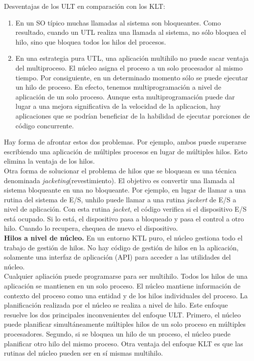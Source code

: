 \documentclass{article}
\begin{document}
					Desventajas de los ULT en comparación con los KLT:
					
					\begin{enumerate}
					\item En un SO típico muchas llamadas al sistema son bloqueantes. Como resultado, cuando un UTL realiza una llamada al sistema, no sólo bloquea el hilo, sino que bloquea todos los hilos del procesos. \\
					 \item En una estrategia pura UTL, una aplicación multihilo no puede sacar ventaja del multiproceso. El núcleo asigna el proceso a un solo procesador al mismo tiempo. Por consiguiente, en un determinado momento sólo se puede ejecutar un hilo de proceso. En efecto, tenemos multiprogramación a nivel de aplicación de un solo proceso. Aunque esta multiprogramación puede dar lugar a una mejora significativa de la velocidad de la aplicacion, hay aplicaciones que se podrían beneficiar de la habilidad de ejecutar porciones de código concurrente.
					\end{enumerate}
					
					Hay forma de afrontar estos dos problemas. Por ejemplo, ambos puede superarse escribiendo una aplicación de múltiples procesos en lugar de múltiples hilos. Esto elimina la ventaja de los hilos. \\
					
					Otra forma de solucionar el problema de hilos que se bloquean es una técnica denominada \textit{jacketing}(revestimiento). El objetivo es convertir una llamada al sistema bloqueante en una no bloqueante. Por ejemplo, en lugar de llamar a una rutina del sistema de E/S, unhilo puede llamar a una rutina \textit{jackert} de E/S a nivel de aplicación. Con esta rutina \textit{jacket}, el código verifica si el dispositivo E/S está ocupado. Si lo está, el dispositivo pasa a bloqueado y pasa el control a otro hilo. Cuando lo recupera, chequea de nuevo el dispositivo. \\
					
					\textbf{Hilos a nivel de núcleo.} En un entorno KTL puro, el núcleo gestiona todo el trabajo de gestión de hilos. No hay código de gestión de hilos en la aplicación, solamente una interfaz de aplicación (API) para acceder a las utilidades del núcleo. \\
					
					Cualquier apliación puede programarse para ser multihilo. Todos los hilos de una aplicación se mantienen en un solo proceso. El núcleo mantiene información de contexto del proceso como una entidad y de los hilos individuales del proceso. La planificación realizada por el núcleo se realiza a nivel de hilo. Este enfoque resuelve los dos principales inconvenientes del enfoque ULT. Primero, el núcleo puede planificar simultáneamente múltiples hilos de un solo proceso en múltiples procesadores. Segundo, si se bloquea un hilo de un proceso, el núcleo puede planificar otro hilo del mismo proceso. Otra ventaja del enfoque KLT es que las rutinas del núcleo pueden ser en sí mismas multihilo. \\
					
\end{document}
